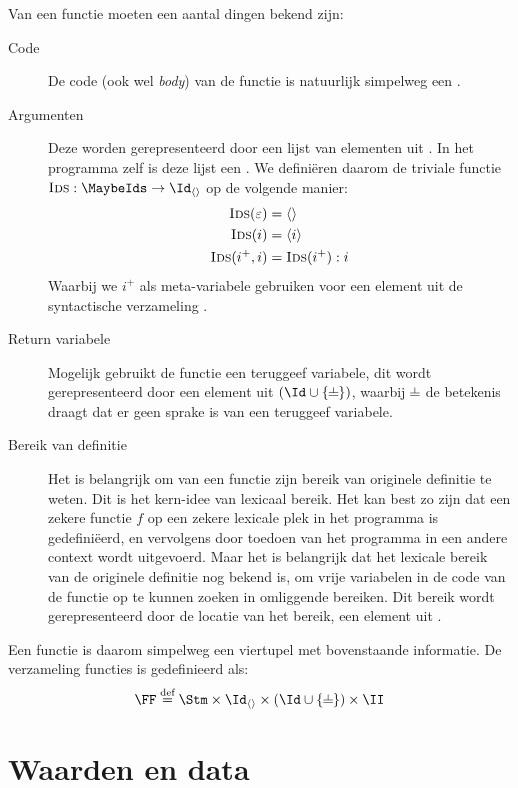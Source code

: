 Van een functie moeten een aantal dingen bekend zijn:
\begin{description}
  \item[Code] De code (ook wel \emph{body}) van de functie is natuurlijk simpelweg een \Stm.
  \item[Argumenten] Deze worden gerepresenteerd door een lijst van elementen uit \Id. In het programma zelf is deze lijst een \MaybeIds. We definiëren daarom de triviale functie $\textsc{Ids} : \MaybeIds \to \Id_{\langle\rangle}$ op de volgende manier:
  \begin{align*}
    \textsc{Ids}(\varepsilon) &= \langle\rangle \\
    \textsc{Ids}(i) &= \langle i \rangle \\
    \textsc{Ids}(i^+, i) &= \textsc{Ids}(i^+) : i
  \end{align*}
  Waarbij we $i^+$ als meta-variabele gebruiken voor een element uit de syntactische verzameling \Ids.
  \item[Return variabele] Mogelijk gebruikt de functie een teruggeef variabele, dit wordt gerepresenteerd door een element uit $(\Id \cup \{\nil\})$, waarbij $\nil$ de betekenis draagt dat er geen sprake is van een teruggeef variabele.
  \item[Bereik van definitie] Het is belangrijk om van een functie zijn bereik van originele definitie te weten. Dit is het kern-idee van lexicaal bereik. Het kan best zo zijn dat een zekere functie $f$ op een zekere lexicale plek in het programma is gedefiniëerd, en vervolgens door toedoen van het programma in een andere context wordt uitgevoerd. Maar het is belangrijk dat het lexicale bereik van de originele definitie nog bekend is, om vrije variabelen in de code van de functie op te kunnen zoeken in omliggende bereiken. Dit bereik wordt gerepresenteerd door de locatie van het bereik, een element uit \II.
\end{description}

Een functie is daarom simpelweg een viertupel met bovenstaande informatie. De verzameling functies is gedefinieerd als:
\begin{equation*}
  \FF \DEF \Stm \times \Id_{\langle\rangle} \times (\Id \cup \{\nil\}) \times \II
\end{equation*}

\section{Waarden en data}
\label{sec:waarden}

